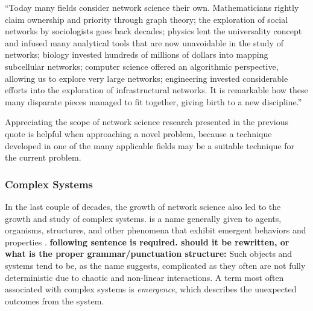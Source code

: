 \begin{displayquote}
``Today many fields consider network science their own. Mathematicians rightly claim ownership and priority through graph theory; the exploration of social networks by sociologists goes back decades; physics lent the universality concept and infused many analytical tools that are now unavoidable in the study of networks; biology invested hundreds of millions of dollars into mapping subcellular networks; computer science offered an algorithmic perspective, allowing us to explore very large networks; engineering invested considerable efforts into the exploration of infrastructural networks. It is remarkable how these many disparate pieces managed to fit together, giving birth to a new discipline.''

\end{displayquote}
Appreciating the scope of network science research presented in the previous quote is helpful when approaching a novel problem, because a technique developed in one of the many applicable fields may be a suitable technique for the current problem. 

\subsubsection{Complex Systems}\label{intro-complex-sys}
In the last couple of decades, the growth of network science also led to the growth and study of complex systems.  is a name generally given to agents, organisms, structures, and other phenomena that exhibit emergent behaviors and properties \citep{Foote2007}. \textbf{following sentence is required. should it be rewritten, or what is the proper grammar/punctuation structure:} Such objects and systems tend to be, as the name suggests, complicated as they often are not fully deterministic due to chaotic and non-linear interactions. A term most often associated with complex systems is \textit{emergence}, which describes the unexpected outcomes from the system. 


